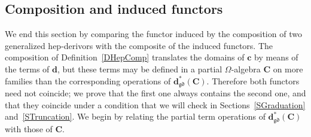 \documentclass[a4paper, reqno
]{amsart}
\newcommand{\gd}{\mathfrak{gd}}              %
\theoremstyle{plain}
\theoremstyle{definition}
\begin{document}
\subsection{Composition and induced functors}\label{SHepCompFunctors}

We end this section by comparing the functor induced by the composition of two generalized hep-derivors with the composite of the induced functors.
The composition of Definition~\ref{DHepComp} translates the domains of $\mathbf{c}$ by means of the terms of $\mathbf{d}$, but these terms may be defined in a partial $\Omega$-algebra $\mathbf{C}$ on more families than the corresponding operations of $\mathbf{d}^{\ast}_{\gd}(\mathbf{C})$.
Therefore both functors need not coincide; we prove that the first one always contains the second one, and that they coincide under a condition that we will check in Sections~\ref{SGraduation} and~\ref{STruncation}.
We begin by relating the partial term operations of $\mathbf{d}^{\ast}_{\gd}(\mathbf{C})$ with those of $\mathbf{C}$.
\end{document}
